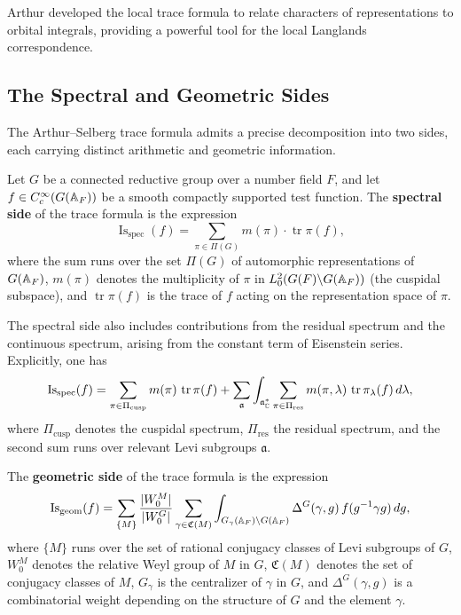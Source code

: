 Arthur developed the local trace formula to relate characters of representations to orbital integrals, providing a powerful tool for the local Langlands correspondence.

\subsection{The Spectral and Geometric Sides}

The Arthur--Selberg trace formula admits a precise decomposition into two sides, each carrying distinct arithmetic and geometric information.

\begin{definition}
Let $G$ be a connected reductive group over a number field $F$, and let $f \in C_c^\infty(G(\mathbb{A}_F))$ be a smooth compactly supported test function. The \textbf{spectral side} of the trace formula is the expression
\[
\operatorname{Is}_{\mathrm{spec}}(f) = \sum_{\pi \in \Pi(G)} m(\pi) \cdot \operatorname{tr} \pi(f),
\]
where the sum runs over the set $\Pi(G)$ of automorphic representations of $G(\mathbb{A}_F)$, $m(\pi)$ denotes the multiplicity of $\pi$ in $L^2_0(G(F)\backslash G(\mathbb{A}_F))$ (the cuspidal subspace), and $\operatorname{tr}\pi(f)$ is the trace of $f$ acting on the representation space of $\pi$.
\end{definition}

The spectral side also includes contributions from the residual spectrum and the continuous spectrum, arising from the constant term of Eisenstein series. Explicitly, one has
\[
\operatorname{Is}_{\mathrm{spec}}(f) = \sum_{\pi \in \Pi_{\mathrm{cusp}}} m(\pi)\,\operatorname{tr}\pi(f) + \sum_{\mathfrak{a}} \int_{\mathfrak{a}^*_{\mathbb{C}}} \sum_{\pi \in \Pi_{\mathrm{res}}} m(\pi,\lambda)\,\operatorname{tr}\pi_\lambda(f)\,d\lambda,
\]
where $\Pi_{\mathrm{cusp}}$ denotes the cuspidal spectrum, $\Pi_{\mathrm{res}}$ the residual spectrum, and the second sum runs over relevant Levi subgroups $\mathfrak{a}$.

\begin{definition}
The \textbf{geometric side} of the trace formula is the expression
\[
\operatorname{Is}_{\mathrm{geom}}(f) = \sum_{\{M\}} \frac{|W_0^M|}{|W_0^G|} \sum_{\gamma \in \mathfrak{C}(M)} \int_{G_\gamma(\mathbb{A}_F)\backslash G(\mathbb{A}_F)} \Delta^G(\gamma, g)\, f(g^{-1}\gamma g)\,dg,
\]
where $\{M\}$ runs over the set of rational conjugacy classes of Levi subgroups of $G$, $W_0^M$ denotes the relative Weyl group of $M$ in $G$, $\mathfrak{C}(M)$ denotes the set of conjugacy classes of $M$, $G_\gamma$ is the centralizer of $\gamma$ in $G$, and $\Delta^G(\gamma, g)$ is a combinatorial weight depending on the structure of $G$ and the element $\gamma$.
\end{definition}


